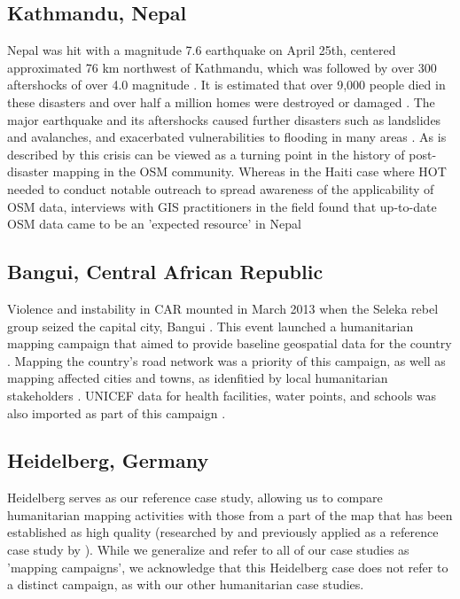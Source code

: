 \subsection{Kathmandu, Nepal}

Nepal was hit with a magnitude 7.6 earthquake on April 25th, centered approximated 76 km northwest of Kathmandu, which was followed by over 300 aftershocks of over 4.0 magnitude \parencite{noauthor_nepal_2015}. It is estimated that over 9,000 people died in these disasters and over half a million homes were destroyed or damaged \parencite{noauthor_nepal_2015}. The major earthquake and its aftershocks caused further disasters such as landslides and avalanches, and exacerbated vulnerabilities to flooding in many areas \parencite{noauthor_nepal_2015}. As is described by \textcite{soden_infrastructure_2016} this crisis can be viewed as a turning point in the history of post-disaster mapping in the OSM community. Whereas in the Haiti case where HOT needed to conduct notable outreach to spread awareness of the applicability of OSM data, interviews with GIS practitioners in the field found that up-to-date OSM data came to be an 'expected resource' in Nepal \parencite[p. 2801]{soden_infrastructure_2016}

\subsection{Bangui, Central African Republic}

Violence and instability in CAR mounted in March 2013 when the Seleka rebel group seized the capital city, Bangui \parencite{noauthor_violence_2020}. This event launched a humanitarian mapping campaign that aimed to provide baseline geospatial data for the country \parencite{noauthor_wikiproject_2020-1}. Mapping the country's road network was a priority of this campaign, as well as mapping affected cities and towns, as idenfitied by local humanitarian stakeholders \parencite{noauthor_wikiproject_2020-1}. UNICEF data for health facilities, water points, and schools was also imported as part of this campaign \parencite{noauthor_wikiproject_2020-1}.

\subsection{Heidelberg, Germany}

Heidelberg serves as our reference case study, allowing us to compare humanitarian mapping activities with those from a part of the map that has been established as high quality (researched by \textcite{arsanjani_assessing_2013} and previously applied as a reference case study by \textcite{anderson_crowd_2018}). While we generalize and refer to all of our case studies as 'mapping campaigns', we acknowledge that this Heidelberg case does not refer to a distinct campaign, as with our other humanitarian case studies. 

